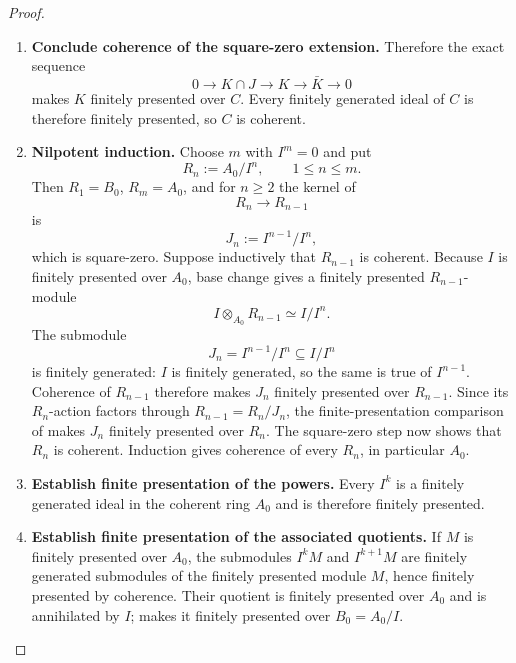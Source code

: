 \begin{proof}
\begin{enumerate}[label=\textup{(\arabic*)}]
    The ideal \(\bar K\) is finitely presented over \(D\) by coherence. The
    finite-presentation comparison
     carries both
    \(K\cap J\) and \(\bar K\) to finitely presented \(C\)-modules.
    \item \textbf{Conclude coherence of the square-zero extension.}
    Therefore
    the exact sequence
    \[
        0\longrightarrow K\cap J
        \longrightarrow K
        \longrightarrow \bar K
        \longrightarrow0
    \]
    makes \(K\) finitely presented over \(C\). Every finitely generated ideal
    of \(C\) is therefore finitely presented, so \(C\) is coherent.
    \item \textbf{Nilpotent induction.}
    Choose \(m\) with \(I^m=0\) and put
    \[
        R_n:=A_0/I^n,
        \qquad 1\leq n\leq m.
    \]
    Then \(R_1=B_0\), \(R_m=A_0\), and for \(n\geq2\) the kernel of
    \[
        R_n\longrightarrow R_{n-1}
    \]
    is
    \[
        J_n:=I^{n-1}/I^n,
    \]
    which is square-zero. Suppose inductively that \(R_{n-1}\) is coherent.
    Because \(I\) is finitely presented over \(A_0\), base change gives a finitely
    presented \(R_{n-1}\)-module
    \[
        I\otimes_{A_0}R_{n-1}
        \simeq
        I/I^n.
    \]
    The submodule
    \[
        J_n=I^{n-1}/I^n\subseteq I/I^n
    \]
    is finitely generated: \(I\) is finitely generated, so the same is true of
    \(I^{n-1}\). Coherence of \(R_{n-1}\) therefore makes \(J_n\) finitely
    presented over \(R_{n-1}\). Since its \(R_n\)-action factors through
    \(R_{n-1}=R_n/J_n\), the finite-presentation comparison of
     makes \(J_n\) finitely presented over \(R_n\). The
    square-zero step now shows that \(R_n\) is coherent. Induction gives
    coherence of every \(R_n\), in particular \(A_0\).
    \item \textbf{Establish finite presentation of the powers.}
    Every \(I^k\) is a finitely generated ideal in the coherent ring \(A_0\) and
    is therefore finitely presented.
    \item \textbf{Establish finite presentation of the associated quotients.}
    If \(M\) is finitely presented over
    \(A_0\), the submodules \(I^kM\) and \(I^{k+1}M\) are finitely generated
    submodules of the finitely presented module \(M\), hence finitely presented by
    coherence. Their quotient is finitely presented over \(A_0\) and is
    annihilated by \(I\);  makes it finitely presented
    over \(B_0=A_0/I\).
\end{enumerate}
\end{proof}


